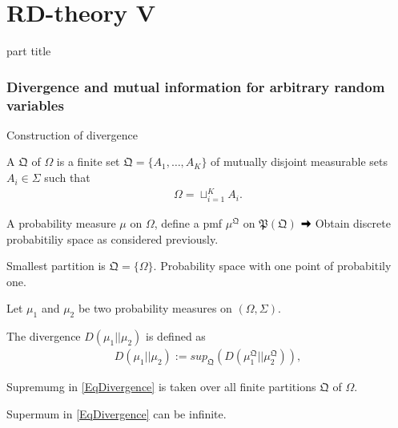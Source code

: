 
\DeclareMathOperator{\cwd}{codeword}
\newtheorem{proposition}{Proposition}
\usepackage{forest}
\usepackage{lipsum}
\usepackage{subcaption}
\usepackage{mathtools}


\section{RD-theory V} 
\begin{frame}
 \vspace{12.0ex}
\begin{center}
\begin{beamercolorbox}[sep=12pt,center]{part title}
\insertsection\par
\end{beamercolorbox}
\end{center}
\end{frame}






\subsubsection{Divergence and mutual information for arbitrary random variables}

\begin{frame}{Construction of divergence}
\bit
\item A  $\mathfrak{Q}$ of $\Omega$ is 
a finite set $\mathfrak{Q}=\{A_1,\dots,A_K\}$ of mutually disjoint measurable sets $A_i\in\Sigma$ such that 
\begin{align*}
\Omega=\sqcup_{i=1}^KA_i. 
\end{align*}
\item A probability measure $\mu$ on $\Omega$, define a pmf $\mu^{\mathfrak{Q}}$ on $\mathfrak{P}(\mathfrak{Q})$ $\iarrow$ Obtain discrete probabitiliy space as considered previously. 
\item Smallest partition is $\mathfrak{Q}=\{\Omega\}$. Probability space with one point of probabitily one. 
\eit

\bit 
\item Let $\mu_1$ and $\mu_2$ be two probability measures on $(\Omega,\Sigma)$. 
\item The divergence $D(\mu_1||\mu_2)$ is defined as 
\begin{align}\label{EqDivergence}
D(\mu_1||\mu_2):=sup_{\mathfrak{Q}}(D(\mu_1^{\mathfrak{Q}}||\mu_2^{\mathfrak{Q}})),
\end{align}
\item Supremumg in \eqref{EqDivergence} is taken over all finite partitions $\mathfrak{Q}$ of $\Omega$. 
\item Supermum in \eqref{EqDivergence} 
can be  infinite. 
\eit 
\end{frame}

